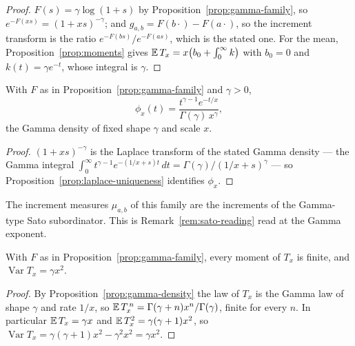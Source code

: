 \begin{proof}
$F(s) = \gamma\log(1+s)$ by Proposition~\ref{prop:gamma-family}, so $e^{-F(xs)} =
(1+xs)^{-\gamma}$; and $g_{a,b} = F(b\cdot) - F(a\cdot)$, so the increment transform is the ratio
$e^{-F(bs)}/e^{-F(as)}$, which is the stated one. For the mean, Proposition~\ref{prop:moments}
gives $\mathbb{E}\,T_x = x\bigl(b_0 + \int_0^\infty k\bigr)$ with $b_0 = 0$ and $k(t) = \gamma e^{-t}$,
whose integral is $\gamma$.
\end{proof}

\begin{proposition}\label{prop:gamma-density}
With $F$ as in Proposition~\ref{prop:gamma-family} and $\gamma > 0$,
\[
  \phi_x(t) = \frac{t^{\gamma - 1} e^{-t/x}}{\Gamma(\gamma)\, x^{\gamma}},
\]
the Gamma density of fixed shape $\gamma$ and scale $x$.
\end{proposition}

\begin{proof}
$(1+xs)^{-\gamma}$ is the Laplace transform of the stated Gamma density --- the Gamma integral
$\int_0^\infty t^{\gamma-1}e^{-(1/x + s)t}\,dt = \Gamma(\gamma)/(1/x + s)^{\gamma}$ --- so
Proposition~\ref{prop:laplace-uniqueness} identifies $\phi_x$.
\end{proof}

\begin{remark}\label{rem:gamma-sato}
The increment measures $\mu_{a,b}$ of this family are the increments of the Gamma-type Sato
subordinator. This is Remark~\ref{rem:sato-reading} read at the Gamma exponent.
\end{remark}

\begin{proposition}\label{prop:gamma-moments}
With $F$ as in Proposition~\ref{prop:gamma-family}, every moment of $T_x$ is finite, and
$\operatorname{Var} T_x = \gamma x^2$.
\end{proposition}

\begin{proof}
By Proposition~\ref{prop:gamma-density} the law of $T_x$ is the Gamma law of shape $\gamma$ and
rate $1/x$, so $\mathbb{E}\,T_x^{\,n} = \Gamma(\gamma+n)x^{n}/\Gamma(\gamma)$, finite for every $n$. In
particular $\mathbb{E}\,T_x = \gamma x$ and $\mathbb{E}\,T_x^{2} = \gamma(\gamma+1)x^2$, so
$\operatorname{Var} T_x = \gamma(\gamma+1)x^2 - \gamma^2x^2 = \gamma x^2$.
\end{proof}

